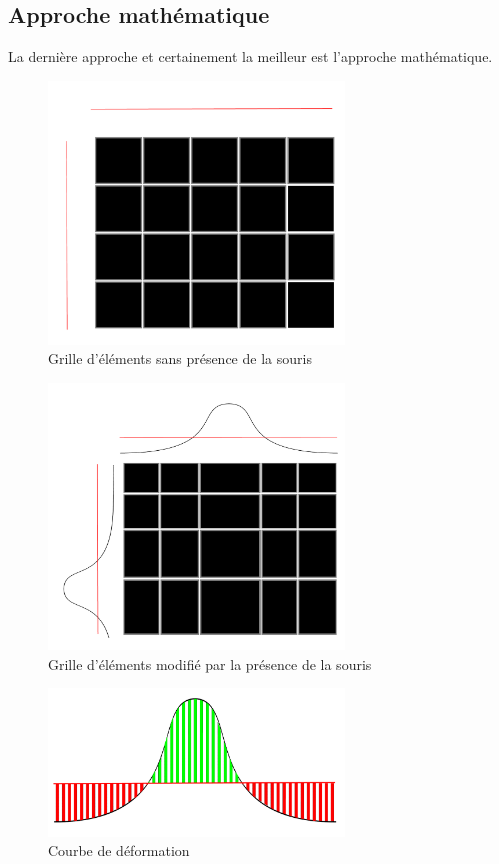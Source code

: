 \subsection{Approche mathématique}

La dernière approche et certainement la meilleur est l'approche
mathématique.

\begin{figure}[H]
  \centering
  \includegraphics[width=0.7\textwidth]{../resources/illustrations/js_1}
  \caption{Grille d'éléments sans présence de la souris}
\end{figure}

\begin{figure}[H]
  \centering
  \includegraphics[width=0.7\textwidth]{../resources/illustrations/js_2}
  \caption{Grille d'éléments modifié par la présence de la souris}
\end{figure}

\begin{figure}[H]
  \centering
  \includegraphics[width=0.7\textwidth]{../resources/illustrations/js_3}
  \caption{Courbe de déformation}
\end{figure}

